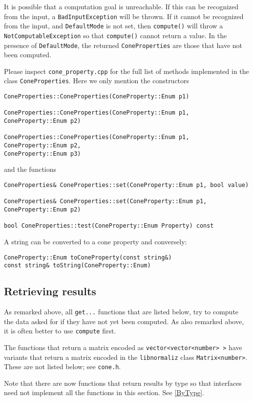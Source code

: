 \documentclass[12pt,a4paper]{scrartcl}
\theoremstyle{definition}
\begin{document}
\begin{small}
It is possible that a computation goal is unreachable. If this can be recognized from the input, a \verb|BadInputException| will be thrown. If it cannot be recognized from the input, and \verb|DefaultMode| is not set, then \verb|compute()| will throw a \verb|NotComputableException| so that \verb|compute()| cannot return a value. In the presence of \verb|DefaultMode|, the returned \verb|ConeProperties| are those that have not been computed.

Please inspect \verb|cone_property.cpp| for the full list of methods implemented in the class \verb|ConeProperties|. Here we only mention the constructors
\begin{Verbatim}
ConeProperties::ConeProperties(ConeProperty::Enum p1)

ConeProperties::ConeProperties(ConeProperty::Enum p1, ConeProperty::Enum p2)

ConeProperties::ConeProperties(ConeProperty::Enum p1, ConeProperty::Enum p2,
ConeProperty::Enum p3)
\end{Verbatim}
and the functions
\begin{Verbatim}
ConeProperties& ConeProperties::set(ConeProperty::Enum p1, bool value)

ConeProperties& ConeProperties::set(ConeProperty::Enum p1, ConeProperty::Enum p2)

bool ConeProperties::test(ConeProperty::Enum Property) const
\end{Verbatim}

A string can be converted to a cone property and conversely:
\begin{Verbatim}
ConeProperty::Enum toConeProperty(const string&)
const string& toString(ConeProperty::Enum)
\end{Verbatim}


\subsection{Retrieving results}

As remarked above, all \verb|get...| functions that are listed below, try to compute the data asked for if they have not yet been computed. As also remarked above, it is often better to use \verb|compute| first.

The functions that return a matrix encoded as \verb|vector<vector<number> >| have variants that return a matrix encoded in the \verb|libnormaliz| class \verb|Matrix<number>|. These are not listed below; see \verb|cone.h|. 

Note that there are now functions that return results by type so that interfaces need not implement all the functions in this section. See \ref{ByType}.


\end{small}
\end{document}

